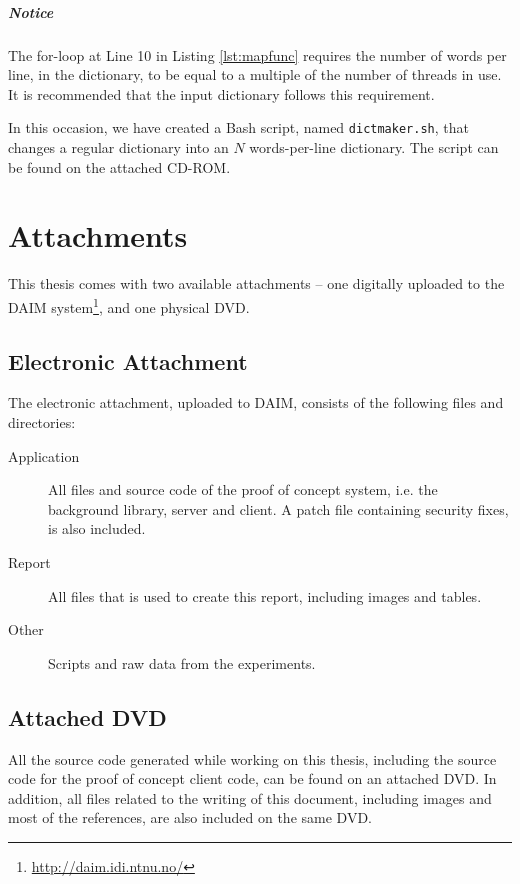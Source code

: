 \documentclass[pdftex,english,10pt,b5paper,twoside]{book}
\begin{document}
\paragraph{Notice} The for-loop at Line 10 in Listing \ref{lst:mapfunc}
requires the number of words per line, in the dictionary, to be equal to a
multiple of the number of threads in use. It is recommended that the input
dictionary follows this requirement.

In this occasion, we have created a Bash script, named \texttt{dictmaker.sh},
that changes a regular dictionary into an $N$ words-per-line dictionary. The
script can be found on the attached CD-ROM.

\chapter{Attachments}
\label{ap:attachments}

This thesis comes with two available attachments -- one digitally uploaded to
the DAIM system\footnote{\url{http://daim.idi.ntnu.no/}}, and one physical DVD.

\section{Electronic Attachment}

The electronic attachment, uploaded to
DAIM, consists of the following files
and directories:

\begin{description}
  \item[Application] All files and source code of the proof of concept system,
    i.e. the background library, server and client. A patch file containing
    security fixes, is also included.
  \item[Report] All files that is used to create this report, including images
    and tables.
  \item[Other] Scripts and raw data from the experiments.
\end{description}

\section{Attached DVD}

All the source code generated while working on this thesis, including the
source code for the proof of concept client code, can be found on an attached
DVD. In addition, all files related to the writing of this document, including
images and most of the references, are also included on the same DVD.
\end{document}
